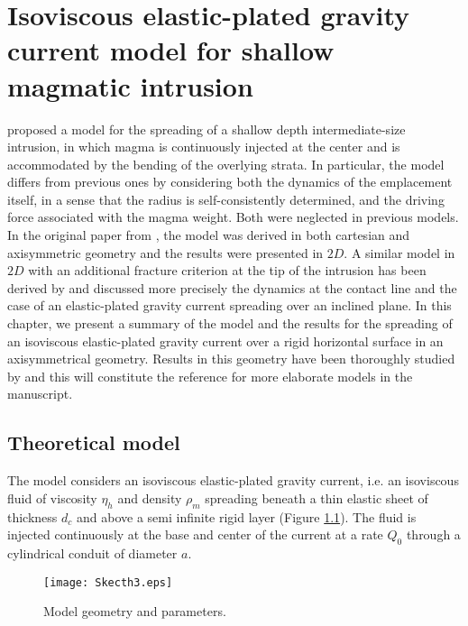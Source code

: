 \chapter{Isoviscous elastic-plated  gravity current model  for shallow
  magmatic intrusion}

\label{chap2} 
\minitoc

\citet{Michaut:2011kg} proposed a model for the spreading of a shallow
depth  intermediate-size intrusion,  in  which  magma is  continuously
injected  at the  center and  is accommodated  by the  bending of  the
overlying strata.  In particular, the model differs from previous ones
by considering both the dynamics of the emplacement itself, in a sense
that the radius is self-consistently determined, and the driving force
associated  with the  magma weight.  Both were  neglected in  previous
models.  In the original  paper from \citet{Michaut:2011kg}, the model
was  derived  in both  cartesian  and  axisymmetric geometry  and  the
results  were presented  in $2D$.   A similar  model in  $2D$ with  an
additional fracture  criterion at  the tip of  the intrusion  has been
derived   by   \citet{Bunger:2011cb}  and   \citet{Anonymous:QWXp_4JV}
discussed more precisely the dynamics at the contact line and the case
of an elastic-plated gravity current spreading over an inclined plane.
In this chapter, we present a summary of the model and the results for
the spreading of  an isoviscous elastic-plated gravity  current over a
rigid horizontal  surface in  an axisymmetrical geometry.   Results in
this geometry  have been  thoroughly studied  by \citet{Lister:2013ia}
and this  will constitute the  reference for more elaborate  models in
the manuscript.

\section{Theoretical model}
\label{C2-sec:model}

The model considers an isoviscous elastic-plated gravity current, i.e.
an  isoviscous  fluid  of  viscosity  $\eta_h$  and  density  $\rho_m$
spreading beneath a thin elastic sheet  of thickness $d_c$ and above a
semi infinite rigid layer \citep{Michaut:2011kg,Bunger:2011cb} (Figure
\ref{C2-Sketch}).  The fluid is injected  continuously at the base and
center of the current at a rate $Q_0$ through a cylindrical conduit of
diameter $a$.

\begin{figure}[h!]
  \begin{center}
    \graphicspath{ {/Users/thorey/Documents/These/Manuscript/Figure/Chapter2/} }
    \texttt{[image: Skecth3.eps]}
    \caption{Model geometry and parameters.}
    \label{C2-Sketch}
  \end{center}
\end{figure}

